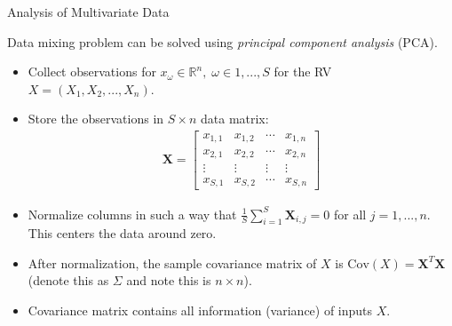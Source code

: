 \documentclass[9pt]{beamer}
\begin{document}
%
\begin{frame}{Analysis of Multivariate Data}

Data mixing problem can be solved using {\em principal component analysis} (PCA). 

\begin{itemize}
\setlength{\itemsep}{10pt}
\item Collect observations for $x_\omega\in \mathbb{R}^n,\; \omega \in 1,...,S$ for the RV $X=(X_1,X_2,...,X_n)$.  
\item Store the observations in $S\times n$ data matrix: 
\begin{align*}
\mathbf{X}=\left[\begin{array}{ccccccc}x_{1,1}&x_{1,2}&\cdots &x_{1,n}\\
x_{2,1}&x_{2,2}&\cdots &x_{2,n}\\
\vdots&\vdots&\vdots &\vdots\\
x_{S,1}&x_{S,2}&\cdots&x_{S,n}
\end{array}
\right]
\end{align*}
\item Normalize columns in such a way that $\frac{1}{S}\sum_{i=1}^S\mathbf{X}_{i,j}=0$ for all $j=1,...,n$.  This centers the data around zero. 
\item After normalization, the sample covariance matrix of $X$ is $\textrm{Cov}(X)=\mathbf{X}^T\mathbf{X}$ (denote this as $\Sigma$ and note this is $n\times n$). 
\item Covariance matrix contains all information (variance) of inputs $X$. 


\end{itemize}


\end{frame}
\end{document}
